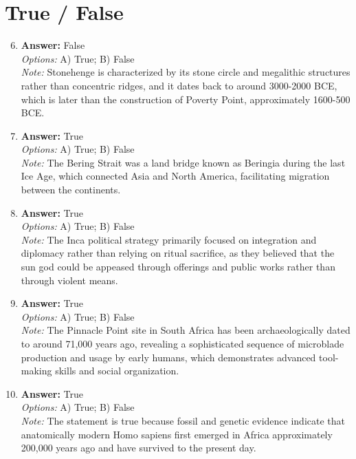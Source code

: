 \documentclass[12pt]{article}
\begin{document}
\section*{True / False}
\begin{enumerate}[label=\arabic*.]
\setcounter{enumi}{5}
\item \textbf{Answer:} False
\\ \textit{Options:} A) True; B) False
\\ \textit{Note:} Stonehenge is characterized by its stone circle and megalithic structures rather than concentric ridges, and it dates back to around 3000-2000 BCE, which is later than the construction of Poverty Point, approximately 1600-500 BCE.
\item \textbf{Answer:} True
\\ \textit{Options:} A) True; B) False
\\ \textit{Note:} The Bering Strait was a land bridge known as Beringia during the last Ice Age, which connected Asia and North America, facilitating migration between the continents.
\item \textbf{Answer:} True
\\ \textit{Options:} A) True; B) False
\\ \textit{Note:} The Inca political strategy primarily focused on integration and diplomacy rather than relying on ritual sacrifice, as they believed that the sun god could be appeased through offerings and public works rather than through violent means.
\item \textbf{Answer:} True
\\ \textit{Options:} A) True; B) False
\\ \textit{Note:} The Pinnacle Point site in South Africa has been archaeologically dated to around 71,000 years ago, revealing a sophisticated sequence of microblade production and usage by early humans, which demonstrates advanced tool-making skills and social organization.
\item \textbf{Answer:} True
\\ \textit{Options:} A) True; B) False
\\ \textit{Note:} The statement is true because fossil and genetic evidence indicate that anatomically modern Homo sapiens first emerged in Africa approximately 200,000 years ago and have survived to the present day.
\end{enumerate}
\end{document}
